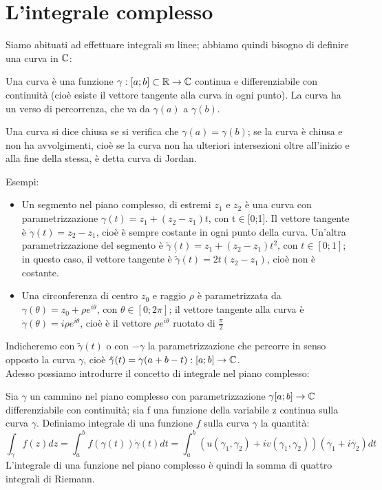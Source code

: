 \chapter{L'integrale complesso}

Siamo abituati ad effettuare integrali su linee; abbiamo quindi bisogno di definire una curva in $\mathbb{C}$:

\begin{definizione}

Una curva è una funzione $\gamma:[a;b]\subset\mathbb{R}\to\mathbb{C}$ continua e differenziabile con continuità (cioè esiste il vettore tangente alla curva in ogni punto). La curva ha un verso di percorrenza, che va da $\gamma(a)$ a $\gamma(b)$.

Una curva si dice chiusa se si verifica che $\gamma(a)=\gamma(b)$; se la curva è chiusa e non ha avvolgimenti, cioè se la curva non ha ulteriori intersezioni oltre all'inizio e alla fine della stessa, è detta curva di Jordan.
\end{definizione}
Esempi:
\begin{itemize}
\item Un segmento nel piano complesso, di estremi $z_1$ e $z_2$ è una curva con parametrizzazione $\gamma(t)=z_1+(z_2-z_1)t$, con t$\in$[0;1]. Il vettore tangente è $\dot{\gamma}(t)=z_2-z_1$, cioè è sempre costante in ogni punto della curva.
Un'altra parametrizzazione del segmento è $\tilde{\gamma}(t)=z_1+(z_2-z_1)t^2$, con $t\in[0;1]$; in questo caso, il vettore tangente è $\dot{\tilde{\gamma}}(t)=2t(z_2-z_1)$, cioè non è costante.
\item Una circonferenza di centro $z_0$ e raggio $\rho$ è parametrizzata da $\gamma(\theta)=z_0+\rho e^{i \theta}$, con $\theta \in[0;2\pi]$; il vettore tangente alla curva è $\dot{\gamma}(\theta)=i \rho e^{i \theta}$, cioè è il vettore $\rho e^{i\theta}$ ruotato di $\frac{\pi}{2}$
\end{itemize}
Indicheremo con $\tilde{\gamma}(t)$ o con $-\gamma$ la parametrizzazione che percorre in senso opposto la curva $\gamma$, cioè $\tilde{\gamma}(t)=\gamma(a+b-t):[a;b]\to\mathbb{C}$.
\\
Adesso possiamo introdurre il concetto di integrale nel piano complesso:
\begin{definizione}
Sia $\gamma$ un cammino nel piano complesso con parametrizzazione $\gamma[a;b]\to\mathbb{C}$ differenziabile con continuità; sia f una funzione della variabile z continua sulla curva $\gamma$. Definiamo integrale di una funzione $f$ sulla curva $\gamma$ la quantità:
$$\int_\gamma f(z)dz=\int_a ^b f(\gamma(t))\dot{\gamma}(t)dt=\int_a ^b (u(\gamma_1,\gamma_2)+iv(\gamma_1,\gamma_2))(\dot{\gamma_1}+i\dot{\gamma_2})dt$$ L'integrale di una funzione nel piano complesso è quindi la somma di quattro integrali di Riemann.
\end{definizione}
